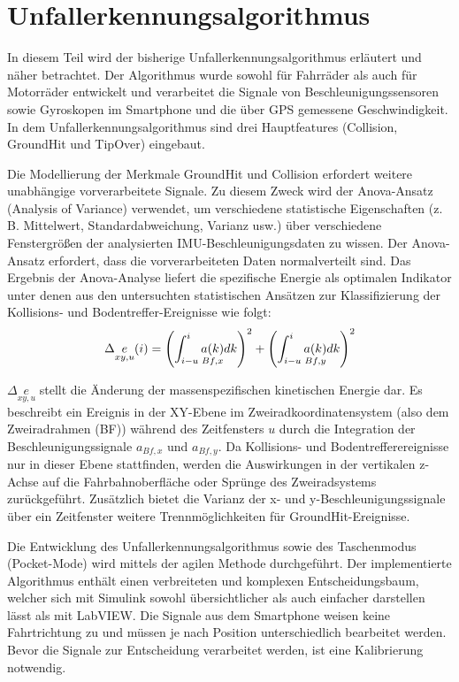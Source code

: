 %
%
%
%
%
%
%
\section{Unfallerkennungsalgorithmus} \label{abs:Unfallerkennungsalgorithmus}
%
%
%
%

In diesem Teil wird der bisherige Unfallerkennungsalgorithmus erläutert und näher betrachtet. Der Algorithmus wurde sowohl für Fahrräder als auch für Motorräder entwickelt und verarbeitet die Signale von Beschleunigungssensoren sowie Gyroskopen im Smartphone und die über GPS gemessene Geschwindigkeit. In dem Unfallerkennungsalgorithmus sind drei Hauptfeatures (Collision, GroundHit und TipOver) eingebaut.

Die Modellierung der Merkmale GroundHit und Collision erfordert weitere un\-ab\-hängige vorverarbeitete Signale. Zu diesem Zweck wird der Anova-Ansatz (Analysis of Variance) verwendet, um verschiedene statistische Eigenschaften (z. B. Mittelwert, Standardabweichung, Varianz usw.) über verschiedene Fenstergrößen der analysierten IMU-Beschleunigungsdaten zu wissen. Der Anova-Ansatz erfordert, dass die vorverarbeiteten Daten normalverteilt sind. Das Ergebnis der Anova-Analyse liefert die spezifische Energie als optimalen Indikator unter denen aus den untersuchten statistischen Ansätzen zur Klassifizierung der Kollisions- und Bodentreffer-Ereignisse wie folgt:
\begin{equation}
	\centering
	\begin{gathered}
		\Delta\underset{xy,u}{e} (i) = \left(\int_{i-u}^{i} \underset{Bf,x}{a(k)} dk \right)^2 + \left(\int_{i-u}^{i} \underset{Bf,y}{a(k)} dk \right)^2
		\label{gl:EnergieFormel_JanPaper}
	\end{gathered}
\end{equation}


$\Delta\underset{xy,u}{e}$ stellt die Änderung der massenspezifischen kinetischen Energie dar. Es beschreibt ein Ereignis in der XY-Ebene im Zweiradkoordinatensystem (also dem Zweiradrahmen (BF)) während des Zeitfensters $u$ durch die Integration der Beschleunigungssignale $a_{Bf,x}$ und $a_{Bf,y}$. Da Kollisions- und Bodentrefferereignisse nur in dieser Ebene stattfinden, werden die Auswirkungen in der vertikalen z-Achse auf die Fahrbahnoberfläche oder Sprünge des Zweiradsystems zurückgeführt. Zusätzlich bietet die Varianz der x- und y-Beschleunigungssignale über ein Zeitfenster weitere Trennmöglichkeiten für GroundHit-Ereignisse. \citep{Schneeclassification2021}

Die Entwicklung des Unfallerkennungsalgorithmus sowie des Taschenmodus (Pocket-Mode) wird mittels der agilen Methode durchgeführt. Der implementierte Algorithmus enthält einen verbreiteten und komplexen Entscheidungsbaum, welcher sich mit Simulink sowohl übersichtlicher als auch einfacher darstellen lässt als mit LabVIEW.
Die Signale aus dem Smartphone weisen keine Fahrtrichtung zu und müssen je nach Position unterschiedlich bearbeitet werden. Bevor die Signale zur Entscheidung verarbeitet werden, ist eine Kalibrierung notwendig.

